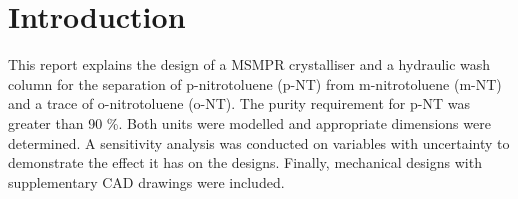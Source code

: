 \section{Introduction}

This report explains the design of a MSMPR crystalliser and a hydraulic wash column for the separation of p-nitrotoluene (p-NT) from m-nitrotoluene (m-NT) and a trace of o-nitrotoluene (o-NT). The purity requirement for p-NT was greater than 90 \%. Both units were modelled and appropriate dimensions were determined. A sensitivity analysis was conducted on variables with uncertainty to demonstrate the effect it has on the designs. Finally, mechanical designs with supplementary CAD drawings were included. 